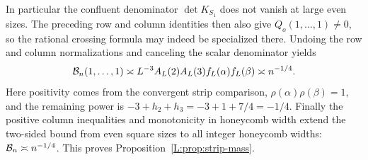 In particular the confluent denominator $\det K_{S_1}$ does not vanish
at large even sizes. The preceding row and column identities then also
give $Q_o(1,\ldots,1)\ne0$, so the rational crossing formula may indeed
be specialized there. Undoing the row and column normalizations and
canceling the scalar denominator yields
\[
 {\cal B}_n(1,\ldots,1)
 \asymp L^{-3}A_L(2)A_L(3)f_L(\alpha)f_L(\beta)
 \asymp n^{-1/4}.
\]
Here positivity comes from the convergent strip comparison,
$\rho(\alpha)\rho(\beta)=1$, and the remaining power is
$-3+h_2+h_3=-3+1+7/4=-1/4$. Finally the positive column inequalities
and monotonicity in honeycomb width extend the two-sided bound from
even square sizes to all integer honeycomb widths:
${\cal B}_n\asymp n^{-1/4}$. This proves Proposition~\ref{L:prop:strip-mass}.
